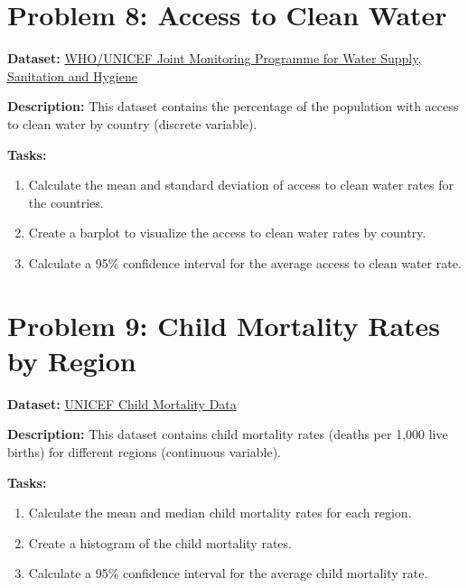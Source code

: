 \documentclass[
  letterpaper,
  DIV=11,
  numbers=noendperiod]{scrreprt}
\providecommand{\tightlist}{%
  \setlength{\itemsep}{0pt}\setlength{\parskip}{0pt}}\usepackage{longtable,booktabs,array}
\begin{document}
\section*{Problem 8: Access to Clean
Water}\label{problem-8-access-to-clean-water}


\textbf{Dataset:} \href{https://washdata.org/}{WHO/UNICEF Joint
Monitoring Programme for Water Supply, Sanitation and Hygiene}

\textbf{Description:} This dataset contains the percentage of the
population with access to clean water by country (discrete variable).

\textbf{Tasks:}

\begin{enumerate}
\def\labelenumi{\arabic{enumi}.}
\tightlist
\item
  Calculate the mean and standard deviation of access to clean water
  rates for the countries.
\item
  Create a barplot to visualize the access to clean water rates by
  country.
\item
  Calculate a 95\% confidence interval for the average access to clean
  water rate.
\end{enumerate}

\section*{Problem 9: Child Mortality Rates by
Region}\label{problem-9-child-mortality-rates-by-region}


\textbf{Dataset:}
\href{https://data.unicef.org/topic/child-survival/under-five-mortality/}{UNICEF
Child Mortality Data}

\textbf{Description:} This dataset contains child mortality rates
(deaths per 1,000 live births) for different regions (continuous
variable).

\textbf{Tasks:}

\begin{enumerate}
\def\labelenumi{\arabic{enumi}.}
\tightlist
\item
  Calculate the mean and median child mortality rates for each region.
\item
  Create a histogram of the child mortality rates.
\item
  Calculate a 95\% confidence interval for the average child mortality
  rate.
\end{enumerate}
\end{document}
